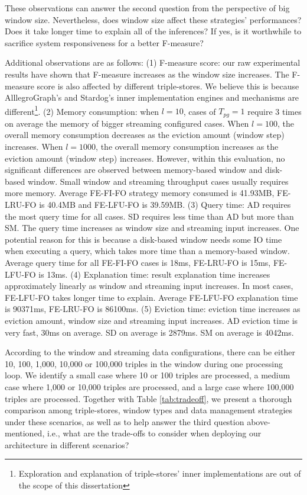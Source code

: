 These observations can answer the second question from the perspective of big window size. 
Nevertheless, does window size affect these strategies' performances? 
Does it take longer time to explain all of the inferences? 
If yes, is it worthwhile to sacrifice system responsiveness for a better F-measure?

Additional observations are as follows:
(1) F-measure score: our raw experimental results have shown that F-measure increases as the window size increases. 
The F-measure score is also affected by different triple-stores. 
We believe this is because AlllegroGraph's and Stardog's inner implementation engines and mechanisms are different\footnote{Exploration and explanation of triple-stores' inner implementations are out of the scope of this dissertation}.    
(2) Memory consumption: when $l=10$, cases of $T_{pg}=1$ require 3 times on average the memory of bigger streaming configured cases. 
When $l=100$, the overall memory consumption decreases as the eviction amount (window step) increases. 
When $l=1000$, the overall memory consumption increases as the eviction amount (window step) increases. 
However, within this evaluation, no significant differences are observed between memory-based window and disk-based window. 
Small window and streaming throughput cases usually requires more memory.
Average FE-FI-FO strategy memory consumed is 41.93MB, FE-LRU-FO is 40.4MB and FE-LFU-FO is 39.59MB.
(3) Query time: AD requires the most query time for all cases. 
SD requires less time than AD but more than SM. 
The query time increases as window size and streaming input increases.
One potential reason for this is because a disk-based window needs some IO time when executing a query, which takes more time than a memory-based window. 
Average query time for all FE-FI-FO cases is 18ms, FE-LRU-FO is 15ms, FE-LFU-FO is 13ms.
(4) Explanation time: result explanation time increases approximately linearly as window and streaming input increases. 
In most cases, FE-LFU-FO takes longer time to explain.
Average FE-LFU-FO explanation time is 90371ms, FE-LRU-FO is 86100ms.
(5) Eviction time: eviction time increases as eviction amount, window size and streaming input increases. 
AD eviction time is very fast, 30ms on average. 
SD on average is 2879ms. 
SM on average is 4042ms.

According to the window and streaming data configurations, there can be either 10, 100, 1,000, 10,000 or 100,000 triples in the window during one processing loop. 
We identify a small case where 10 or 100 triples are processed, a medium case where 1,000 or 10,000 triples are processed, and a large case where 100,000 triples are processed. 
Together with Table \ref{tab:tradeoff}, we present a thorough comparison among triple-stores, window types and data management strategies under these scenarios, as well as to help answer the third question above-mentioned, i.e., what are the trade-offs to consider when deploying our architecture in different scenarios?

